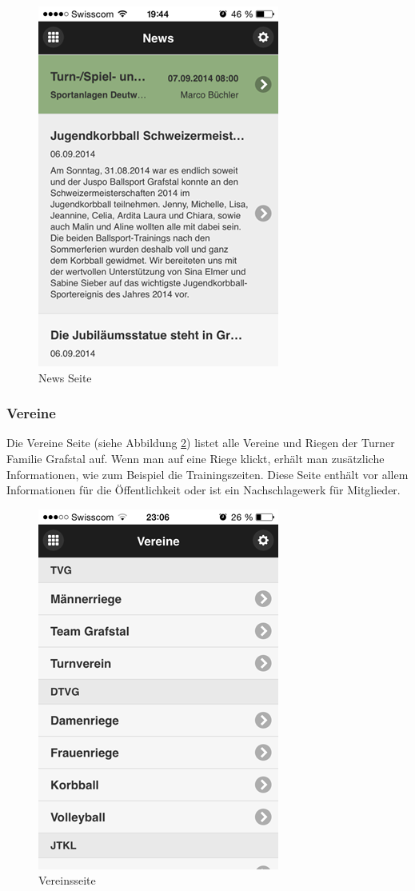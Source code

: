 \begin{figure}[h]
\centering
\includegraphics[scale=0.5]{images/app/news.png}
\caption{News Seite}
\label{fig:app_news}
\end{figure}

\FloatBarrier
\subsubsection{Vereine}
Die Vereine Seite (siehe Abbildung \ref{fig:app_vereine})  listet alle Vereine und Riegen der Turner Familie Grafstal auf. Wenn man auf eine Riege klickt, erhält man zusätzliche Informationen, wie zum Beispiel die Trainingszeiten. Diese Seite enthält vor allem Informationen für die Öffentlichkeit oder ist ein Nachschlagewerk für Mitglieder.


\begin{figure}[h]
\centering
\includegraphics[scale=0.5]{images/app/vereine.png}
\caption{Vereinsseite}
\label{fig:app_vereine}
\end{figure}

